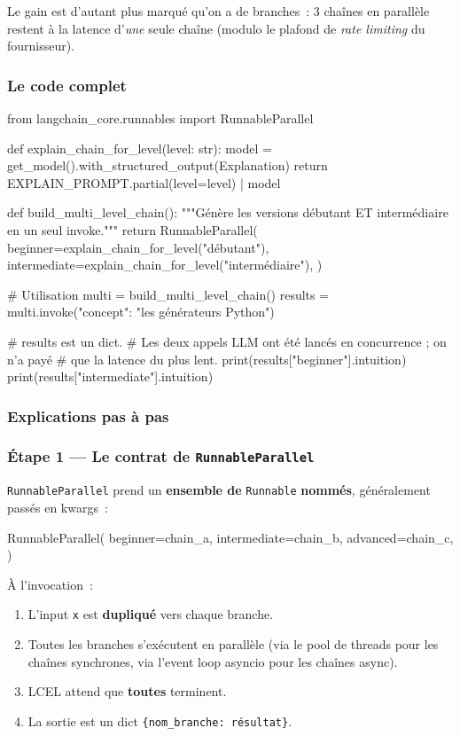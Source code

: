 \documentclass[11pt,a4paper]{article}
\begin{document}
Le gain est d'autant plus marqué qu'on a de branches~: 3 chaînes en
parallèle restent à la latence d'\emph{une} seule chaîne (modulo le
plafond de \emph{rate limiting} du fournisseur).

\subsubsection{Le code complet}

\begin{pythoncode}
from langchain_core.runnables import RunnableParallel

def explain_chain_for_level(level: str):
    model = get_model().with_structured_output(Explanation)
    return EXPLAIN_PROMPT.partial(level=level) | model


def build_multi_level_chain():
    """Génère les versions débutant ET intermédiaire en un seul invoke."""
    return RunnableParallel(
        beginner=explain_chain_for_level("débutant"),
        intermediate=explain_chain_for_level("intermédiaire"),
    )


# Utilisation
multi = build_multi_level_chain()
results = multi.invoke({"concept": "les générateurs Python"})

# results est un dict.
# Les deux appels LLM ont été lancés en concurrence ; on n'a payé
# que la latence du plus lent.
print(results["beginner"].intuition)
print(results["intermediate"].intuition)
\end{pythoncode}

\subsubsection{Explications pas à pas}

\subsubsection*{Étape 1 — Le contrat de \texttt{RunnableParallel}}

\texttt{RunnableParallel} prend un \textbf{ensemble de} \texttt{Runnable}
\textbf{nommés}, généralement passés en kwargs~:

\begin{pythoncode}
RunnableParallel(
    beginner=chain_a,
    intermediate=chain_b,
    advanced=chain_c,
)
\end{pythoncode}

À l'invocation~:

\begin{enumerate}[leftmargin=*]
  \item L'input \texttt{x} est \textbf{dupliqué} vers chaque branche.
  \item Toutes les branches s'exécutent en parallèle (via le pool de
        threads pour les chaînes synchrones, via l'event loop asyncio
        pour les chaînes async).
  \item LCEL attend que \textbf{toutes} terminent.
  \item La sortie est un dict \texttt{\{nom\_branche: résultat\}}.
\end{enumerate}
\end{document}
